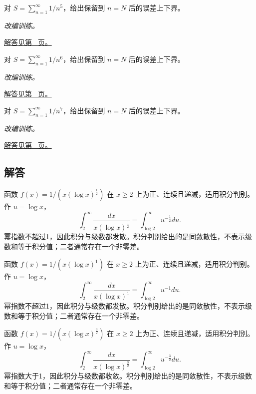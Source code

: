 \documentclass[UTF8,12pt,a4paper,fontset=fandol]{ctexart}
\begin{document}
\begin{example}[正项级数的尾和积分界]\label{ex:c25q22}
对 $S=\sum_{n=1}^\infty1/n^{5}$，给出保留到 $n=N$ 后的误差上下界。
\par\textit{改编训练。}\par\hyperref[ans:c25q22]{解答见第~\pageref{ans:c25q22} 页。}
\end{example}
\begin{example}[正项级数的尾和积分界]\label{ex:c25q23}
对 $S=\sum_{n=1}^\infty1/n^{6}$，给出保留到 $n=N$ 后的误差上下界。
\par\textit{改编训练。}\par\hyperref[ans:c25q23]{解答见第~\pageref{ans:c25q23} 页。}
\end{example}
\begin{example}[正项级数的尾和积分界]\label{ex:c25q24}
对 $S=\sum_{n=1}^\infty1/n^{7}$，给出保留到 $n=N$ 后的误差上下界。
\par\textit{改编训练。}\par\hyperref[ans:c25q24]{解答见第~\pageref{ans:c25q24} 页。}
\end{example}
\subsection{解答}
\begin{solve}\label{ans:c25q1}
函数 $f(x)=1/(x(\log x)^{\frac{1}{2}})$ 在 $x\ge2$ 上为正、连续且递减，适用积分判别。作 $u=\log x$，
\[
\int_2^\infty\frac{dx}{x(\log x)^{\frac{1}{2}}}=\int_{\log2}^\infty u^{-\frac{1}{2}}du.
\]
幂指数不超过1，因此积分与级数都发散。积分判别给出的是同敛散性，不表示级数和等于积分值；二者通常存在一个非零差。
\end{solve}

\begin{solve}\label{ans:c25q2}
函数 $f(x)=1/(x(\log x)^{1})$ 在 $x\ge2$ 上为正、连续且递减，适用积分判别。作 $u=\log x$，
\[
\int_2^\infty\frac{dx}{x(\log x)^{1}}=\int_{\log2}^\infty u^{-1}du.
\]
幂指数不超过1，因此积分与级数都发散。积分判别给出的是同敛散性，不表示级数和等于积分值；二者通常存在一个非零差。
\end{solve}

\begin{solve}\label{ans:c25q3}
函数 $f(x)=1/(x(\log x)^{\frac{3}{2}})$ 在 $x\ge2$ 上为正、连续且递减，适用积分判别。作 $u=\log x$，
\[
\int_2^\infty\frac{dx}{x(\log x)^{\frac{3}{2}}}=\int_{\log2}^\infty u^{-\frac{3}{2}}du.
\]
幂指数大于1，因此积分与级数都收敛。积分判别给出的是同敛散性，不表示级数和等于积分值；二者通常存在一个非零差。
\end{solve}
\end{document}
